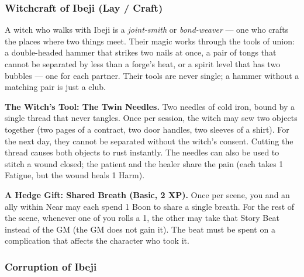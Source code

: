 \subsubsection*{Witchcraft of Ibeji (Lay / Craft)}

A witch who walks with Ibeji is a \textit{joint-smith} or \textit{bond-weaver} --- one who crafts the places where two things meet. Their magic works through the tools of union: a double-headed hammer that strikes two nails at once, a pair of tongs that cannot be separated by less than a forge's heat, or a spirit level that has two bubbles --- one for each partner. Their tools are never single; a hammer without a matching pair is just a club.

\textbf{The Witch's Tool: The Twin Needles.} Two needles of cold iron, bound by a single thread that never tangles. Once per session, the witch may sew two objects together (two pages of a contract, two door handles, two sleeves of a shirt). For the next day, they cannot be separated without the witch's consent. Cutting the thread causes both objects to rust instantly. The needles can also be used to stitch a wound closed; the patient and the healer share the pain (each takes 1 Fatigue, but the wound heals 1 Harm).

\textbf{A Hedge Gift: Shared Breath (Basic, 2 XP).} Once per scene, you and an ally within Near may each spend 1 Boon to share a single breath. For the rest of the scene, whenever one of you rolls a 1, the other may take that Story Beat instead of the GM (the GM does not gain it). The beat must be spent on a complication that affects the character who took it.

\subsubsection*{Corruption of Ibeji}

